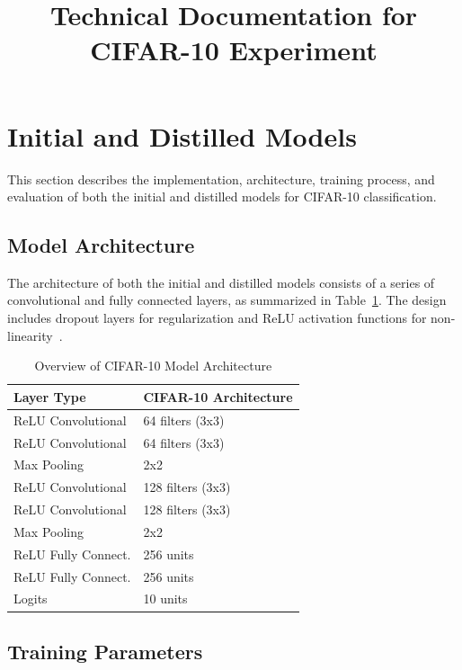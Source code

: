 \documentclass[a4paper, 11pt]{article}
\title{Technical Documentation for CIFAR-10 Experiment}
\author{}
\date{}
\begin{document}
\maketitle

\section{Initial and Distilled Models}

This section describes the implementation, architecture, training process, and evaluation of both the initial and distilled models for CIFAR-10 classification.

\subsection{Model Architecture}

The architecture of both the initial and distilled models consists of a series of convolutional and fully connected layers, as summarized in Table~\ref{tab:architecture}. The design includes dropout layers for regularization and ReLU activation functions for non-linearity~\cite{krizhevsky2012imagenet}.

\begin{table}[H]
    \centering
    \caption{Overview of CIFAR-10 Model Architecture}
    \label{tab:architecture}
    \begin{tabular}{@{}ll@{}}
        \toprule
        \textbf{Layer Type} & \textbf{CIFAR-10 Architecture} \\
        \midrule
        ReLU Convolutional  & 64 filters (3x3) \\
        ReLU Convolutional  & 64 filters (3x3) \\
        Max Pooling         & 2x2 \\
        ReLU Convolutional  & 128 filters (3x3) \\
        ReLU Convolutional  & 128 filters (3x3) \\
        Max Pooling         & 2x2 \\
        ReLU Fully Connect. & 256 units \\
        ReLU Fully Connect. & 256 units \\
        Logits              & 10 units \\
        \bottomrule
    \end{tabular}
\end{table}

\subsection{Training Parameters}
\end{document}
